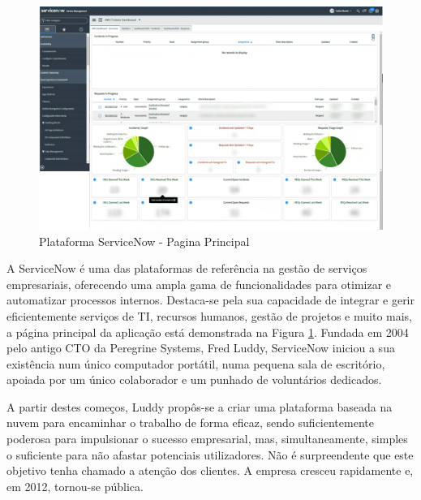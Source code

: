         \begin{figure}[htbp]
            \centering
            \includegraphics[width=\textwidth]{imgs/ServiceNow.png} %
            \caption[Plataforma ServiceNow - Pagina Principal]{Plataforma ServiceNow - Pagina Principal\protect\footnotemark}\label{fig:service-ui}
        \end{figure}

        A ServiceNow é uma das plataformas de referência na gestão de serviços empresariais, oferecendo uma ampla gama de funcionalidades para otimizar e automatizar processos internos. Destaca-se pela sua capacidade de integrar e gerir eficientemente serviços de TI, recursos humanos, gestão de projetos e muito mais, a página principal da aplicação está demonstrada na Figura \ref{fig:service-ui}. Fundada em 2004 pelo antigo CTO da Peregrine Systems, Fred Luddy, ServiceNow iniciou a sua existência num único computador portátil, numa pequena sala de escritório, apoiada por um único colaborador e um punhado de voluntários dedicados.

        A partir destes começos, Luddy propôs-se a criar uma plataforma baseada na nuvem para encaminhar o trabalho de forma eficaz, sendo suficientemente poderosa para impulsionar o sucesso empresarial, mas, simultaneamente, simples o suficiente para não afastar potenciais utilizadores. Não é surpreendente que este objetivo tenha chamado a atenção dos clientes. A empresa cresceu rapidamente e, em 2012, tornou-se pública.
        

